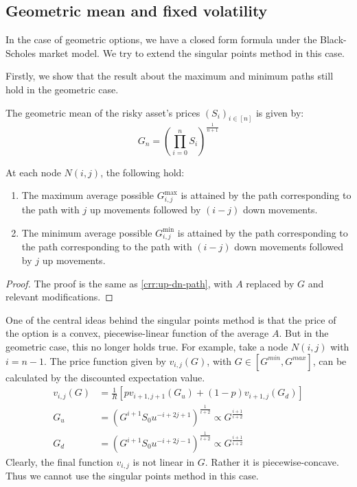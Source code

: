 \subsection{Geometric mean and fixed volatility}
\label{sec:gm-fixed-vol}

In the case of geometric options, we have a closed form formula under the Black-Scholes market model. We try to extend the singular points method in this case.

Firstly, we show that the result about the maximum and minimum paths still hold in the geometric case.

\begin{dfn}
	The geometric mean of the risky asset's prices $ (S_i)_{i \in [n]} $ is given by:
	\begin{equation}
		\label{eq:gm}
		G_{n} = \left( \prod_{i=0}^n S_i \right) ^{\frac{1}{n+1}}
	\end{equation}
\end{dfn}


\begin{lmm}
	At each node $N(i,j)$, the following hold:
	\begin{enumerate}
	\item The maximum average possible $ G_{i,j}^{\max} $ is attained by the path corresponding to the path with $j$ up movements followed by $(i-j)$ down movements.
	\item The minimum average possible $ G_{i,j}^{\min} $ is attained by the path corresponding to the path corresponding to the path with $(i-j)$ down movements followed by $j$ up movements.
	\end{enumerate}
\end{lmm}

\begin{proof}
	The proof is the same as \ref{crr:up-dn-path}, with $A$ replaced by $G$ and relevant modifications.
\end{proof}


One of the central ideas behind the singular points method is that the price of the option is a convex, piecewise-linear function of the average $A$. But in the geometric case, this no longer holds true. For example, take a node $N(i,j)$ with $ i = n-1 $. The price function given by $ v_{i,j}(G) $, with $ G \in [G^{min},G^{max}] $, can be calculated by the discounted expectation value.
\begin{align}
	v_{i,j}(G) &= \frac{1}{R} \left[ p v_{i+1,j+1}(G_u) + (1-p) v_{i+1,j}(G_d) \right] \\
	G_u &= \left( G^{i+1} S_0 u^{-i+2j+1} \right)^{\frac{1}{i+2}} \propto G^{\frac{i+1}{i+2}} \\
	G_d &= \left( G^{i+1} S_0 u^{-i+2j-1} \right)^{\frac{1}{i+2}} \propto G^{\frac{i+1}{i+2}}
\end{align}
Clearly, the final function $ v_{i,j} $ is not linear in $G$. Rather it is piecewise-concave. Thus we cannot use the singular points method in this case.


